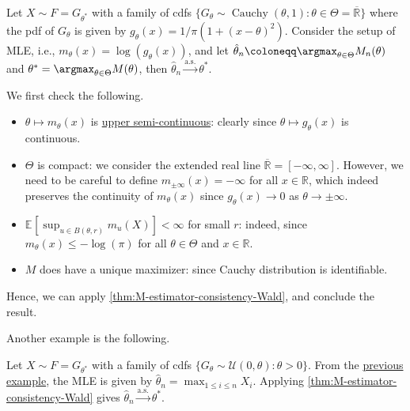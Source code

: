 \begin{eg}[Cauchy]
	Let \(X \sim F = G_{\theta ^{\ast} }\) with a family of cdfs \(\{ G_\theta \sim \operatorname{Cauchy}(\theta , 1) \colon \theta \in \Theta = \overline{\mathbb{R}} \} \) where the pdf of \(G_\theta \) is given by \(g_\theta (x) = 1 / \pi (1 + (x - \theta )^2)\). Consider the setup of MLE, i.e., \(m_\theta (x) = \log (g_\theta (x))\), and let \(\hat{\theta} _n \coloneqq \argmax_{\theta \in \Theta } M_n(\theta )\) and \(\theta ^{\ast} = \argmax_{\theta \in \Theta } M(\theta )\), then \(\hat{\theta} _n \overset{\text{a.s.} }{\to} \theta ^{\ast}\).
\end{eg}
\begin{explanation}
	We first check the following.
	\begin{itemize}
		\item \(\theta \mapsto m_\theta (x)\) is \hyperref[def:upper-semi-continuous]{upper semi-continuous}: clearly since \(\theta \mapsto g_\theta (x)\) is continuous.
		\item \(\Theta \) is compact: we consider the extended real line \(\overline{\mathbb{R}} = [-\infty , \infty ]\). However, we need to be careful to define \(m_{\pm \infty }(x) = -\infty \) for all \(x \in \mathbb{R} \), which indeed preserves the continuity of \(m_\theta (x)\) since \(g_\theta (x) \to 0\) as \(\theta \to \pm \infty \).
		\item \(\mathbb{E}_{}[\sup _{u \in B(\theta , r)} m_u(X)] < \infty \) for small \(r\): indeed, since \(m_\theta (x) \leq - \log (\pi )\) for all \(\theta \in \Theta \) and \(x \in \mathbb{R} \).
		\item \(M\) does have a unique maximizer: since Cauchy distribution is identifiable.
	\end{itemize}
	Hence, we can apply \autoref{thm:M-estimator-consistency-Wald}, and conclude the result.
\end{explanation}

Another example is the following.

\begin{eg}[Uniform]\label{eg:uniform-MLE}
	Let \(X \sim F = G_{\theta ^{\ast} }\) with a family of cdfs \(\{ G_\theta \sim \mathcal{U} (0, \theta ) \colon \theta > 0 \}\). From the \hyperref[eg:supremum-estimation-MLE]{previous example}, the MLE is given by \(\hat{\theta} _n = \max _{1 \leq i \leq n} X_i\). Applying \autoref{thm:M-estimator-consistency-Wald} gives \(\hat{\theta} _n \overset{\text{a.s.} }{\to} \theta ^{\ast} \).
\end{eg}

